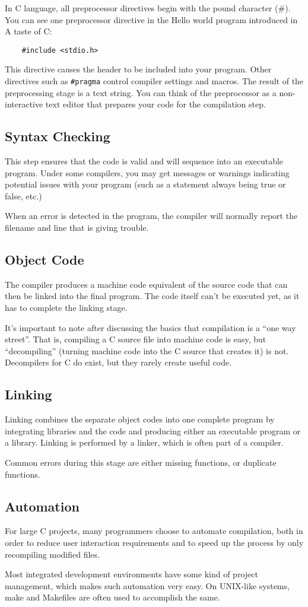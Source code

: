 In C language, all preprocessor directives begin with the pound character (\#).
You can see one preprocessor directive in the Hello world program introduced in
A taste of C:

\begin{verbatim}
	#include <stdio.h>
\end{verbatim}

This directive causes the header to be included into your program. Other
directives such as \texttt{\#pragma} control compiler settings and macros. The
result of the preprocessing stage is a text string. You can think of the
preprocessor as a non-interactive text editor that prepares your code for the
compilation step.

\subsection{Syntax Checking}
This step ensures that the code is valid and will sequence into an executable
program. Under some compilers, you may get messages or warnings indicating
potential issues with your program (such as a statement always being true or
false, etc.) 

When an error is detected in the program, the compiler will normally report the
filename and line that is giving trouble. 

\subsection{Object Code}
The compiler produces a machine code equivalent of the source code that can
then be linked into the final program. The code itself can't be executed yet,
as it has to complete the linking stage. 

It's important to note after discussing the basics that compilation is a ``one
way street''. That is, compiling a C source file into machine code is easy, but
``decompiling'' (turning machine code into the C source that creates it) is
not. Decompilers for C do exist, but they rarely create useful code.

\subsection{Linking}
Linking combines the separate object codes into one complete program by
integrating libraries and the code and producing either an executable program
or a library. Linking is performed by a linker, which is often part of a
compiler.

Common errors during this stage are either missing functions, or duplicate
functions.

\subsection{Automation}
For large C projects, many programmers choose to automate compilation, both in
order to reduce user interaction requirements and to speed up the process by
only recompiling modified files.

Most integrated development environments have some kind of project management,
which makes such automation very easy. On UNIX-like systems, make and Makefiles
are often used to accomplish the same.
